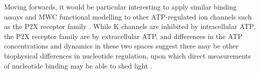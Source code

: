 Moving forwards, it would be particular interesting to apply similar binding assays and MWC functional modelling to other ATP-regulated ion channels such as the P2X receptor family \cite{khakh_p2x_2006}.
While K\ATP{} channels are inhibited by intracellular ATP, the P2X receptor family are  by extracellular ATP, and differences in the ATP concentrations and dynamics in these two spaces suggest there may be other biophysical differences in nucleotide regulation, upon which direct measurements of nucleotide binding may be able to shed light \cite{mansoor_x-ray_2016}.
